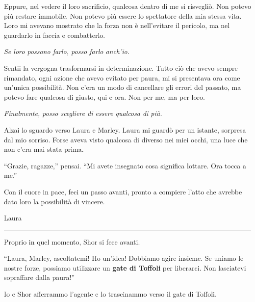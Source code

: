 Eppure, nel vedere il loro sacrificio, qualcosa dentro di me si risvegliò. Non potevo più restare immobile. Non potevo più essere lo spettatore della mia stessa vita. Loro mi avevano mostrato che la forza non è nell’evitare il pericolo, ma nel guardarlo in faccia e combatterlo.

\textit{Se loro possono farlo, posso farlo anch’io.}

Sentii la vergogna trasformarsi in determinazione. Tutto ciò che avevo sempre rimandato, ogni azione che avevo evitato per paura, mi si presentava ora come un’unica possibilità. Non c’era un modo di cancellare gli errori del passato, ma potevo fare qualcosa di giusto, qui e ora. Non per me, ma per loro.

\textit{Finalmente, posso scegliere di essere qualcosa di più.}

Alzai lo sguardo verso Laura e Marley. Laura mi guardò per un istante, sorpresa dal mio sorriso. Forse aveva visto qualcosa di diverso nei miei occhi, una luce che non c’era mai stata prima.

\enquote{Grazie, ragazze,} pensai. \enquote{Mi avete insegnato cosa significa lottare. Ora tocca a me.}

Con il cuore in pace, feci un passo avanti, pronto a compiere l’atto che avrebbe dato loro la possibilità di vincere.
\newpage
\vspace{1em}
\begin{center}Laura\end{center}
\hrule
\vspace{1em}


Proprio in quel momento, Shor si fece avanti.

\begin{dialogue}
 \enquote{Laura, Marley, ascoltatemi! Ho un'idea! Dobbiamo agire insieme. Se uniamo le nostre forze, possiamo utilizzare un \textbf{gate di Toffoli} per liberarci. Non lasciatevi sopraffare dalla paura!}
\end{dialogue}

Io e Shor afferrammo l'agente e lo trascinammo verso il gate di Toffoli.

